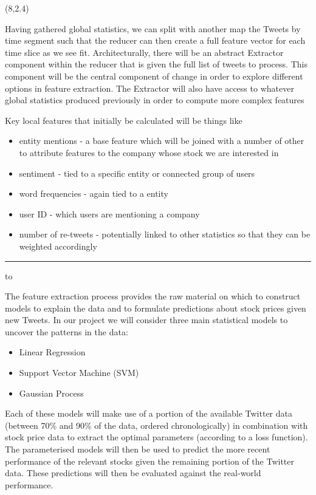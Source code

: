 \documentclass[a0]{a0poster}
\def\Head#1{\noindent\hbox to \hsize{\hfil{\LARGE\color{DarkBlue}\sf #1}}\bigskip}
\def\Subhead#1{\noindent{\large\color{DarkBlue}\sf #1}\bigskip}
\begin{document}
\begin{textblock}{7}(8,2.4)

\Subhead{Extractor}

\sf
Having gathered global statistics, we can split with another map the Tweets by time segment such that the reducer can then create a full feature vector for each time slice as we see fit.
Architecturally, there will be an abstract Extractor component within the reducer that is given the full list of tweets to process.
This component will be the central component of change in order to explore different options in feature extraction.
The Extractor will also have access to whatever global statistics produced previously in order to compute more complex features

\sf
Key local features that initially be calculated will be things like
\begin{itemize}
\item entity mentions - a base feature which will be joined with a number of other to attribute features to the company whose stock we are interested in
\item sentiment - tied to a specific entity or connected group of users
\item word frequencies - again tied to a entity
\item user ID - which users are mentioning a company
\item number of re-tweets - potentially linked to other statistics so that they can be weighted accordingly
\end{itemize}

\bigskip
\hrule





\Head{Machine Learning}

\sf
The feature extraction process provides the raw material on which to construct models to explain the data and to formulate predictions about stock prices given new Tweets. In our project we will consider three main statistical models to uncover the patterns in the data:
\begin{itemize}
\item Linear Regression
\item Support Vector Machine (SVM)
\item Gaussian Process
\end{itemize}
Each of these models will make use of a portion of the available Twitter data (between 70\% and 90\% of the data, ordered chronologically) in combination with stock price data to extract the optimal parameters (according to a loss function). The parameterised models will then be used to predict the more recent performance of the relevant stocks given the remaining portion of the Twitter data. These predictions will then be evaluated against the real-world performance. 


\end{textblock}
\end{document}
